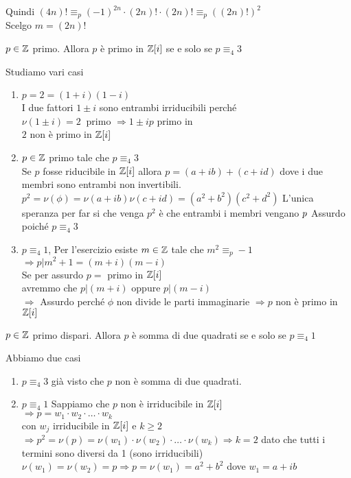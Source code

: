 \documentclass[12px]{article}
\begin{document}
Quindi $(4n)!\equiv_p (-1)^{2n}\cdot (2n)!\cdot (2n)!\equiv_p ((2n)!)^2$\\
Scelgo  $m = (2n)!$\\
 \begin{prop}
	 $p\in\mathbb{Z}$ primo. Allora $p$ è primo in $\mathbb{Z}[i] $ se e solo se $p\equiv_4 3$
\end{prop}
\begin{dimo}
	Studiamo vari casi
	\begin{enumerate}
		\item $p = 2 = (1+i)(1-i)$ \\
			I due fattori $1 \pm i$ sono entrambi irriducibili perché  $\nu (1\pm i) = 2 \ \text{ primo } \Rightarrow 1\pm ip$ primo in \Z[i]\\
			$2$ non è primo in $\mathbb{Z}[i]$
		\item  $p\in\mathbb{Z}$ primo tale che $p\equiv_4 3$\\
			Se $p$ fosse riducibile in $\mathbb{Z}[i]$ allora $p = (a + ib) + (c + id)$ dove i due membri sono entrambi non invertibili.\\
			$p^2= \nu(\phi)= \nu(a + ib)\nu (c +id) = (a^2 + b^2)(c^2+d^2)$ 
L'unica speranza per far si che venga $p^2$ è che entrambi i membri vengano $p\\
$ \Rightarrow Assurdo poiché $p \equiv_4 3$
\item $p\equiv_4 1$, Per l'esercizio esiste $m\in\mathbb{Z}$ tale che  $m^2\equiv_p -1$\\
	 $ \Rightarrow p | m^2 + 1 = (m+i)(m-i)$ \\
	 Se per assurdo $p = $ primo in  $\mathbb{Z}[i]$\\
	 avremmo che  $p|(m+i)$ oppure  $p | (m-i)$\\
	 $ \Rightarrow $ Assurdo perché $\phi$ non divide le parti immaginarie  $ \Rightarrow p$ non è primo in $\mathbb{Z}[i]$
	\end{enumerate}
\end{dimo}
\begin{coro}
	$p\in\mathbb{Z}$ primo dispari. Allora  $p$ è somma di due quadrati se e solo se $p\equiv _4 1$
\end{coro}
\begin{dimo}
	Abbiamo due casi 
	\begin{enumerate}
		\item $p\equiv_4 3$ già visto che  $p$ non è somma di due quadrati.
		\item $p\equiv_4 1$ Sappiamo che  $p$ non è irriducibile in $\mathbb{Z}[i]$\\
			 $ \Rightarrow p= w_1\cdot w_2\cdot\ldots\cdot w_k$ \\
			 con $w_j$ irriducibile in $\mathbb{Z}[i]$ e  $k\geq 2$\\
			  $ \Rightarrow p^2 = \nu(p) = \nu(w_1) \cdot \nu (w_2)\cdot \ldots\cdot \nu(w_k)  \Rightarrow  k = 2$ dato che tutti i termini sono diversi da 1 (sono irriducibili)\\
			  $\nu(w_1) = \nu (w_2) = p \Rightarrow  p = \nu(w_1) = a^2 + b^2$ dove $w_1 = a + ib$
	\end{enumerate}
\end{dimo}
\end{document}
